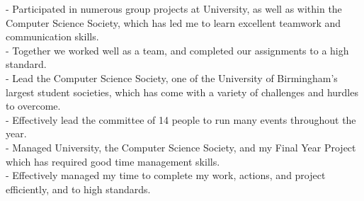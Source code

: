 \documentclass[twoside]{article}
\begin{document}
- Participated in numerous group projects at University, as well as within the Computer Science Society, which has led me to learn excellent teamwork and communication skills.\\
- Together we worked well as a team, and completed our assignments to a high standard.\\
- Lead the Computer Science Society, one of the University of Birmingham's largest student societies, which has come with a variety of challenges and hurdles to overcome.\\
- Effectively lead the committee of 14 people to run many events throughout the year.\\
- Managed University, the Computer Science Society, and my Final Year Project which has required good time management skills.\\
- Effectively managed my time to complete my work, actions, and project efficiently, and to high standards.\vspace{2pt}
\end{document}

